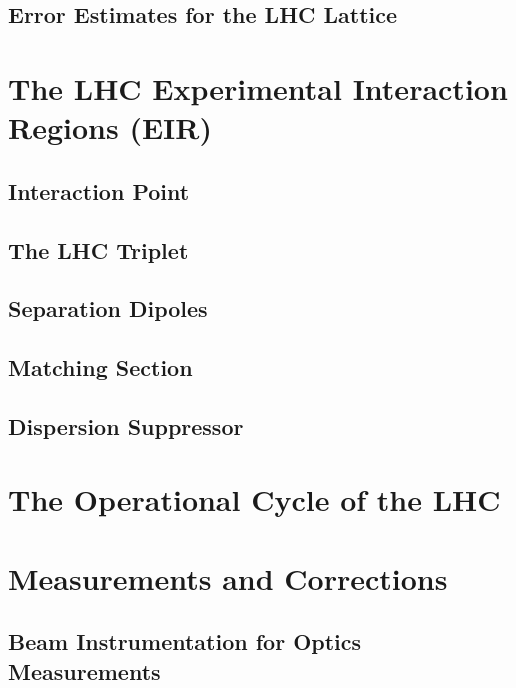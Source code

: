 \subsection{Error Estimates for the LHC Lattice}


\section{The LHC Experimental Interaction Regions (EIR)}

\subsection{Interaction Point}

\subsection{The LHC Triplet}

\subsection{Separation Dipoles}

\subsection{Matching Section}

\subsection{Dispersion Suppressor}


\section{The Operational Cycle of the LHC}


\section{Measurements and Corrections}


\subsection{Beam Instrumentation for Optics Measurements}

